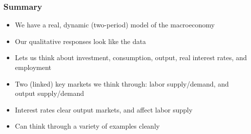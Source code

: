 \documentclass{beamer}
\begin{document}
\begin{frame} 
\frametitle[alignment=center]{Summary} 
\begin{itemize}
\item We have a real, dynamic (two-period) model of the macroeconomy
\bigskip
\item Our 	qualitative responses look like the data
\bigskip
\item  Lets us think about investment, consumption, output, real interest rates, and employment
\bigskip
\item Two (linked) key markets we think through:  labor supply/demand, and output supply/demand
\bigskip
\item Interest rates clear output markets, and affect labor supply
\bigskip
\item Can think through a variety of examples cleanly
\end{itemize}
\end{frame}
\end{document}

